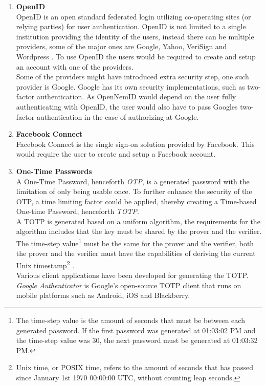 \documentclass[twosided]{report}
\begin{document}
\begin{enumerate}
	\item[] \textbf{OpenID}\\
		OpenID is an open standard federated login utilizing co-operating sites (or relying parties) for user authentication. OpenID is not limited to a single institution providing the identity of the users, instead there can be multiple providers, some of the major ones are Google, Yahoo, VeriSign and Wordpress \cite{openid}. To use OpenID the users would be required to create and setup an account with one of the providers.\\
		Some of the providers might have introduced extra security step, one such provider is Google. Google has its own security implementations, such as two-factor authentication. As OpenNemID would depend on the user fully authenticating with OpenID, the user would also have to pass Googles two-factor authentication in the case of authorizing at Google.
	\item[] \textbf{Facebook Connect}\\
		Facebook Connect is the single sign-on solution provided by Facebook. This would require the user to create and setup a Facebook account. 
	\item[] \textbf{One-Time Passwords}\\
		A One-Time Password, henceforth \emph{OTP}, is a generated password with the limitation of only being usable once. To further enhance the security of the OTP, a time limiting factor could be applied, thereby creating a Time-based One-time Password, henceforth \emph{TOTP}.\\
		A TOTP is generated based on a uniform algorithm, the requirements for the algorithm includes that the key must be shared by the prover and the verifier. The time-step value\footnote{The time-step value is the amount of seconds that must be between each generated password. If the first password was generated at 01:03:02 PM and the time-step value was 30, the next password must be generated at 01:03:32 PM.} must be the same for the prover and the verifier, both the prover and the verifier must have the capabilities of deriving the current Unix timestamp\footnote{Unix time, or POSIX time, refers to the amount of seconds that has passed since January 1st 1970 00:00:00 UTC, without counting leap seconds.} \cite{rfc6238}.\\
		Various client applications have been developed for generating the TOTP. \emph{Google Authenticator} is Google's open-source TOTP client that runs on mobile platforms such as Android, iOS and Blackberry.

\end{enumerate}
\end{document}
